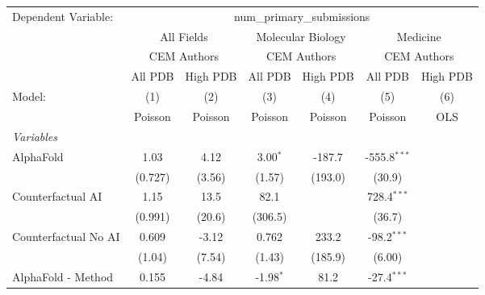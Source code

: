 \begingroup
\centering
\begin{tabular}{lcccccc}
   \tabularnewline \midrule \midrule
   Dependent Variable: & \multicolumn{6}{c}{num\_primary\_submissions}\\
 & \multicolumn{2}{c}{All Fields} & \multicolumn{2}{c}{Molecular Biology} & \multicolumn{2}{c}{Medicine} \\
\cmidrule(lr){2-3} \cmidrule(lr){4-5} \cmidrule(lr){6-7}
 & \multicolumn{2}{c}{CEM Authors} & \multicolumn{2}{c}{CEM Authors} & \multicolumn{2}{c}{CEM Authors} \\
\cmidrule(lr){2-3} \cmidrule(lr){4-5} \cmidrule(lr){6-7}
 & \multicolumn{1}{c}{All PDB} & \multicolumn{1}{c}{High PDB} & \multicolumn{1}{c}{All PDB} & \multicolumn{1}{c}{High PDB} & \multicolumn{1}{c}{All PDB} & \multicolumn{1}{c}{High PDB} \\
\cmidrule(lr){2-2} \cmidrule(lr){3-3} \cmidrule(lr){4-4} \cmidrule(lr){5-5} \cmidrule(lr){6-6} \cmidrule(lr){7-7}
   Model:                                                     & (1)          & (2)        & (3)         & (4)     & (5)            & (6)\\  
                                                              &  Poisson     & Poisson    & Poisson     & Poisson & Poisson        & OLS\\  
   \midrule
   \emph{Variables}\\
   AlphaFold                                                  & 1.03         & 4.12       & 3.00$^{*}$  & -187.7  & -555.8$^{***}$ &   \\   
                                                              & (0.727)      & (3.56)     & (1.57)      & (193.0) & (30.9)         &   \\   
   Counterfactual AI                                          & 1.15         & 13.5       & 82.1        &         & 728.4$^{***}$  &   \\   
                                                              & (0.991)      & (20.6)     & (306.5)     &         & (36.7)         &   \\   
   Counterfactual No AI                                       & 0.609        & -3.12      & 0.762       & 233.2   & -98.2$^{***}$  &   \\   
                                                              & (1.04)       & (7.54)     & (1.43)      & (185.9) & (6.00)         &   \\   
   AlphaFold - Method                                         & 0.155        & -4.84      & -1.98$^{*}$ & 81.2    & -27.4$^{***}$  &   \\   

\end{tabular}
